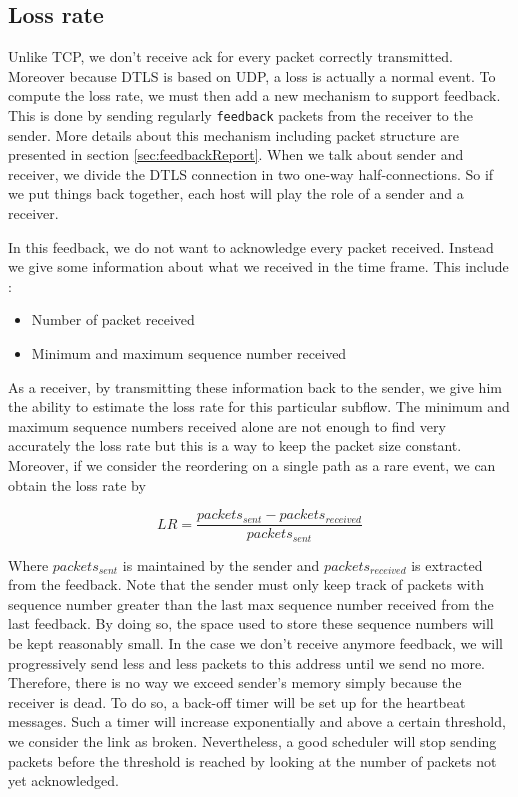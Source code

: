 \subsection{Loss rate}

Unlike TCP, we don't receive ack for every packet correctly transmitted. Moreover because DTLS is based on UDP, a loss is actually a normal event. To compute the loss rate, we must then add a new mechanism to support feedback. This is done by sending regularly \texttt{feedback} packets from the receiver to the sender. More details about this mechanism including packet structure are presented in section \ref{sec:feedbackReport}. When we talk about sender and receiver, we divide the DTLS connection in two one-way half-connections. So if we put things back together, each host will play the role of a sender and a receiver.

In this feedback, we do not want to acknowledge every packet received. Instead we give some information about what we received in the time frame. This include : 

\begin{itemize}
\item Number of packet received
\item Minimum and maximum sequence number received
\end{itemize}

As a receiver, by transmitting these information back to the sender, we give him the ability to estimate the loss rate for this particular subflow. The minimum and maximum sequence numbers received alone are not enough to find very accurately the loss rate but this is a way to keep the packet size constant. Moreover, if we consider the reordering on a single path as a rare event, we can obtain the loss rate by 

\begin{equation*}
LR = \frac{packets_{sent} - packets_{received}}{packets_{sent}}
\end{equation*}

Where $packets_{sent}$ is maintained by the sender and $packets_{received}$ is extracted from the feedback. Note that the sender must only keep track of packets with sequence number greater than the last max sequence number received from the last feedback. By doing so, the space used to store these sequence numbers will be kept reasonably small. In the case we don't receive anymore feedback, we will progressively send less and less packets to this address until we send no more. Therefore, there is no way we exceed sender's memory simply because the receiver is dead. To do so, a back-off timer will be set up for the heartbeat messages. Such a timer will increase exponentially and above a certain threshold, we consider the link as broken. Nevertheless, a good scheduler will stop sending packets before the threshold is reached by looking at the number of packets not yet acknowledged. 

